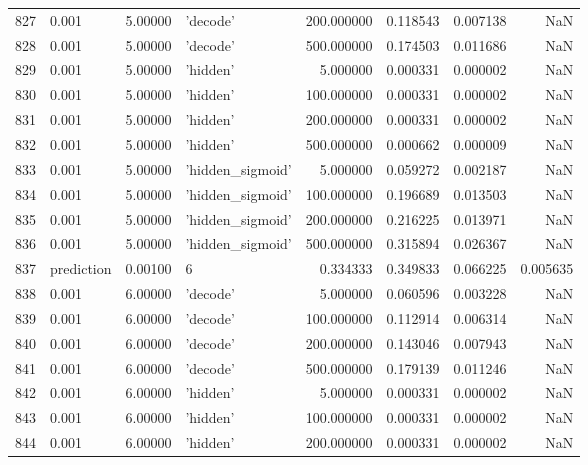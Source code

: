\documentclass[10pt,a4paper]{article}
\begin{document}
\begin{tabular}{llrlrrrr}
827  &       0.001 &   5.00000 &           'decode' &  200.000000 &  0.118543 &  0.007138 &       NaN \\
828  &       0.001 &   5.00000 &           'decode' &  500.000000 &  0.174503 &  0.011686 &       NaN \\
829  &       0.001 &   5.00000 &           'hidden' &    5.000000 &  0.000331 &  0.000002 &       NaN \\
830  &       0.001 &   5.00000 &           'hidden' &  100.000000 &  0.000331 &  0.000002 &       NaN \\
831  &       0.001 &   5.00000 &           'hidden' &  200.000000 &  0.000331 &  0.000002 &       NaN \\
832  &       0.001 &   5.00000 &           'hidden' &  500.000000 &  0.000662 &  0.000009 &       NaN \\
833  &       0.001 &   5.00000 &   'hidden\_sigmoid' &    5.000000 &  0.059272 &  0.002187 &       NaN \\
834  &       0.001 &   5.00000 &   'hidden\_sigmoid' &  100.000000 &  0.196689 &  0.013503 &       NaN \\
835  &       0.001 &   5.00000 &   'hidden\_sigmoid' &  200.000000 &  0.216225 &  0.013971 &       NaN \\
836  &       0.001 &   5.00000 &   'hidden\_sigmoid' &  500.000000 &  0.315894 &  0.026367 &       NaN \\
837  &  prediction &   0.00100 &                  6 &    0.334333 &  0.349833 &  0.066225 &  0.005635 \\
838  &       0.001 &   6.00000 &           'decode' &    5.000000 &  0.060596 &  0.003228 &       NaN \\
839  &       0.001 &   6.00000 &           'decode' &  100.000000 &  0.112914 &  0.006314 &       NaN \\
840  &       0.001 &   6.00000 &           'decode' &  200.000000 &  0.143046 &  0.007943 &       NaN \\
841  &       0.001 &   6.00000 &           'decode' &  500.000000 &  0.179139 &  0.011246 &       NaN \\
842  &       0.001 &   6.00000 &           'hidden' &    5.000000 &  0.000331 &  0.000002 &       NaN \\
843  &       0.001 &   6.00000 &           'hidden' &  100.000000 &  0.000331 &  0.000002 &       NaN \\
844  &       0.001 &   6.00000 &           'hidden' &  200.000000 &  0.000331 &  0.000002 &       NaN \\

\end{tabular}
\end{document}
